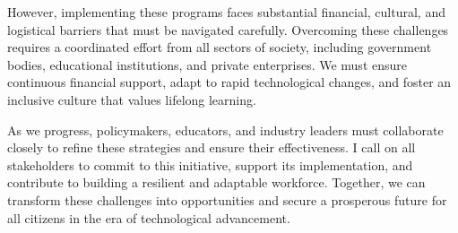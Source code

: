 \documentclass[11pt]{article}
\begin{document}
However, implementing these programs faces substantial financial, cultural, and logistical barriers that must be navigated carefully. Overcoming these challenges requires a coordinated effort from all sectors of society, including government bodies, educational institutions, and private enterprises. We must ensure continuous financial support, adapt to rapid technological changes, and foster an inclusive culture that values lifelong learning.

As we progress, policymakers, educators, and industry leaders must collaborate closely to refine these strategies and ensure their effectiveness. I call on all stakeholders to commit to this initiative, support its implementation, and contribute to building a resilient and adaptable workforce. Together, we can transform these challenges into opportunities and secure a prosperous future for all citizens in the era of technological advancement.
\end{document}
